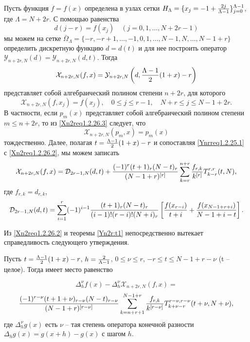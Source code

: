 Пусть функция $f=f(x)$ определена в узлах сетки
     $H_\Lambda=\{x_j=-1+{2j\over\Lambda-1}\}_{j=0}^{\Lambda-1}$,
     где $\Lambda=N+2r$. С помощью равенства
     \begin{equation}\label{Xn2req1.2.26.1}
     d(j-r)=f(x_j)\quad(j=0,1,\ldots,N+2r-1)
\end{equation}
 мы можем  на сетке
$\bar \Omega_\Lambda =  \{-r,-r+1,\ldots,-1,0,1,\ldots,N-1,N,\ldots,N-1+r\}$ определить дискретную функцию
$d=d(t)$ и для нее построить оператор $\mathcal{Y}_{n+2r,N}(d)=\mathcal{Y}_{n+2r,N}(d,t)$. Тогда
  \begin{equation}\label{Xn2req1.2.26.2}
           \mathcal{X}_{n+2r,N}(f,x)=  \mathcal{Y}_{n+2r,N}
     \left(d,{\Lambda-1\over2}(1+x)-r\right)
  \end{equation}
представляет собой алгебраический полином степени $n+2r$, для которого
         \begin{equation}\label{Xn2req1.2.26.3}
           \mathcal{X}_{n+2r,N}(f,x_j)=f(x_j), \quad 0\le j\le r-1,\quad
          N+r\le j\le N-1+2r.
          \end{equation}
В частности, если $p_m(x)$ представляет собой алгебраический полином
степени  $m\le n+2r$, то из \eqref{Xn2req1.2.26.3} следует, что
\begin{equation}\label{Xn2req1.2.26.4}
\mathcal{X}_{n+2r,N}(p_m,x)=p_m(x)
\end{equation}
тождественно. Далее, полагая $t={\Lambda-1\over2}(1+x)-r$ и сопоставляя \eqref{Ynrreq1.2.25.1} с \eqref{Xn2req1.2.26.2}, мы
можем записать
\begin{equation}\label{Xn2req1.2.26.5}
\mathcal{X}_{n+2r,N}(f,x)=\mathcal{D}_{2r-1,N}(d,t)+{(-1)^r (t+1)_r(N-t)_r\over (N-1+r)^{[r]}}
\sum_{k=r}^{n+r} {f_{r,k}\over k^{[r]}} T_{k-r}^{r,r}(t,N),
 \end{equation}
где $f_{r,k}=d_{r,k}$,
\begin{equation}\label{Xn2req1.2.26.6}
\mathcal{D}_{2r-1,N}(d,t)=
\sum_{i=1}^r(-1)^{i-1}{(t+1)_r(N-t)_r\over
(i-1)!(r-i)!(N+i)_r}\left[{f(x_{r-i})\over t+i}+{f(x_{N-1+r+i})\over
N-1+i-t}\right].
\end{equation}

Из  \eqref{Xn2req1.2.26.2} и теоремы \ref{Yn2r:t1} непосредственно вытекает справедливость следующего утверждения.

\begin{theorem}\label{Xn2r:t1} Пусть $t={\Lambda-1\over2}(1+x)-r$, $h={2\over \Lambda-1}$, $0\le\nu\le r$, $-r\le t\le N-1+r-\nu$ (t -- целое). Тогда имеет место равенство

    $$
     \Delta^\nu_h f(x)- \Delta^\nu_h\mathcal{X}_{n+2r,N}(f,x)=
     $$
    $$
{(-1)^{r-\nu}(t+1+\nu)_{r-\nu}(N-t)_{r-\nu} \over(N-1+r)^{[r-\nu]}}
\sum_{k=n+r+1}^{N-1+r}{f_{r,k}\over k^{[r-\nu]}} T_{k+\nu-r}^{r-\nu,r-\nu}(t+\nu,N+\nu),
    $$
где $\Delta^\nu_h g(x)$ есть $\nu$ -- тая степень оператора  конечной разности $\Delta_h g(x)=g(x+h)-g(x)$  с шагом $h$.
\end{theorem}

